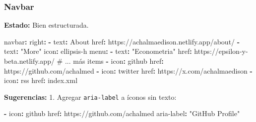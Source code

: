 \documentclass[
  doc,
  floatsintext,
  longtable,
  a4paper,
  nolmodern,
  notxfonts,
  notimes,
  12pt,
  colorlinks=true,linkcolor=blue,citecolor=blue,urlcolor=blue]{apa7}
\newenvironment{Shaded}{\begin{snugshade}}{\end{snugshade}}
\newcommand{\AttributeTok}[1]{\textcolor[rgb]{0.40,0.45,0.13}{#1}}
\newcommand{\CommentTok}[1]{\textcolor[rgb]{0.37,0.37,0.37}{#1}}
\newcommand{\FunctionTok}[1]{\textcolor[rgb]{0.28,0.35,0.67}{#1}}
\newcommand{\KeywordTok}[1]{\textcolor[rgb]{0.00,0.23,0.31}{\textbf{#1}}}
\newcommand{\StringTok}[1]{\textcolor[rgb]{0.13,0.47,0.30}{#1}}
\begin{document}
\subsubsection{Navbar}\label{navbar}

\textbf{Estado:} Bien estructurada.

\begin{Shaded}
\begin{Highlighting}[]
\FunctionTok{navbar}\KeywordTok{:}
\AttributeTok{  }\FunctionTok{right}\KeywordTok{:}
\AttributeTok{    }\KeywordTok{{-}}\AttributeTok{ }\FunctionTok{text}\KeywordTok{:}\AttributeTok{ About}
\AttributeTok{      }\FunctionTok{href}\KeywordTok{:}\AttributeTok{ https://achalmaedison.netlify.app/about/}
\AttributeTok{    }\KeywordTok{{-}}\AttributeTok{ }\FunctionTok{text}\KeywordTok{:}\AttributeTok{ }\StringTok{"More"}
\AttributeTok{      }\FunctionTok{icon}\KeywordTok{:}\AttributeTok{ ellipsis{-}h}
\AttributeTok{      }\FunctionTok{menu}\KeywordTok{:}
\AttributeTok{        }\KeywordTok{{-}}\AttributeTok{ }\FunctionTok{text}\KeywordTok{:}\AttributeTok{ }\StringTok{"Econometria"}
\AttributeTok{          }\FunctionTok{href}\KeywordTok{:}\AttributeTok{ https://epsilon{-}y{-}beta.netlify.app/}
\CommentTok{        \# ... más items}
\AttributeTok{    }\KeywordTok{{-}}\AttributeTok{ }\FunctionTok{icon}\KeywordTok{:}\AttributeTok{ github}
\AttributeTok{      }\FunctionTok{href}\KeywordTok{:}\AttributeTok{ https://github.com/achalmed}
\AttributeTok{    }\KeywordTok{{-}}\AttributeTok{ }\FunctionTok{icon}\KeywordTok{:}\AttributeTok{ twitter}
\AttributeTok{      }\FunctionTok{href}\KeywordTok{:}\AttributeTok{ https://x.com/achalmaedison}
\AttributeTok{    }\KeywordTok{{-}}\AttributeTok{ }\FunctionTok{icon}\KeywordTok{:}\AttributeTok{ rss}
\AttributeTok{      }\FunctionTok{href}\KeywordTok{:}\AttributeTok{ index.xml}
\end{Highlighting}
\end{Shaded}

\textbf{Sugerencias:} 1. Agregar \texttt{aria-label} a íconos sin texto:

\begin{Shaded}
\begin{Highlighting}[]
\KeywordTok{{-}}\AttributeTok{ }\FunctionTok{icon}\KeywordTok{:}\AttributeTok{ github}
\AttributeTok{  }\FunctionTok{href}\KeywordTok{:}\AttributeTok{ https://github.com/achalmed}
\AttributeTok{  }\FunctionTok{aria{-}label}\KeywordTok{:}\AttributeTok{ }\StringTok{"GitHub Profile"}
\end{Highlighting}
\end{Shaded}
\end{document}
